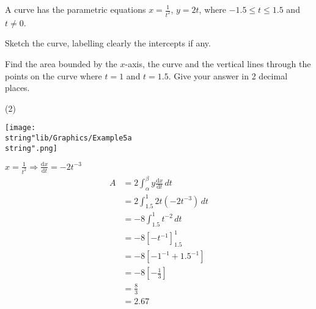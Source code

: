 \documentclass[11pt,a4paper]{book}
\begin{document}
\begin{example}

A curve has the parametric equations ${\displaystyle x=\frac{1}{t^{2}}}$,
$y=2t$, where $-1.5\leq t\leq1.5$ and $t\neq0$.

\begin{tasks}[label=(\alph*),label-width=3.5ex]

\task Sketch the curve, labelling clearly the intercepts if any.

\task Find the area bounded by the $x$-axis, the curve and the vertical
lines through the points on the curve where $t=1$ and $t=1.5$. Give
your answer in 2 decimal places.

\end{tasks}

\Solution

\begin{tasks}[label=(\alph*),label-width=3.5ex](2)

\task \texttt{[image: \\string"lib/Graphics/Example5a\\string".png]}

\task ${\displaystyle x=\frac{1}{t^{2}}\Rightarrow\frac{\mathrm{d}x}{\mathrm{d}t}=-2t^{-3}}$
\begin{align*}
A & =2\int_{\alpha}^{\beta}y\frac{\mathrm{d}x}{\mathrm{d}t}\,dt\\
 & =2\int_{1.5}^{1}2t\left(-2t^{-3}\right)\,dt\\
 & =-8\int_{1.5}^{1}t^{-2}\,dt\\
 & =-8\left[-t^{-1}\right]_{1.5}^{1}\\
 & =-8\left[-1^{-1}+1.5^{-1}\right]\\
 & =-8\left[-\frac{1}{3}\right]\\
 & =\frac{8}{3}\\
 & =2.67
\end{align*}

\end{tasks}

\end{example}
\end{document}
